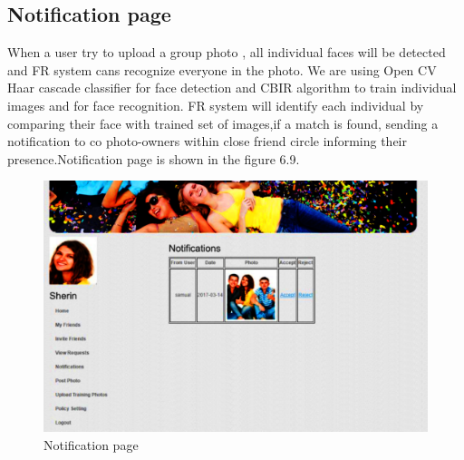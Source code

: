  \subsection[Notification Page]{Notification page}
\noindent
When a user try to upload a group photo , all  individual faces will be detected and FR system  cans recognize everyone in the photo. We are using Open CV Haar cascade classifier  for face detection and CBIR algorithm to train individual images and for face recognition. FR system will identify each individual by comparing their face with  trained set of  images,if a match is found,  sending a notification to co photo-owners within close friend circle  informing their presence.Notification page is shown in the figure 6.9. 
 \vspace{1cm} 
\vspace{1cm}
\vspace{1cm}
\begin{figure}[H]
\begin{minipage}[c]{1\linewidth}
\begin{center}
\includegraphics[width=\textwidth]{sherinnew.png}
            \caption[ Notification Page]{Notification page}
             \label{Notification}
\end{center}
 \end{minipage}             
\end{figure}
\clearpage
